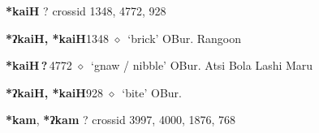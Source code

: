 \item
\textbf{*kaiH}
?
  {\tiny crossid 1348, 4772, 928}
  \begin{list}{}{\leftmargin=1.5em \itemindent=-1.5em}
  \item {\footnotesize \textbf{*ʔkaiH, *kaiH}}{\tiny 1348}
         $\diamond$~`brick'
         OBur. 
\hspace{1ex}
         Rangoon 
  \item {\footnotesize \textbf{*kaiH\,?\,}}{\tiny 4772}
\hspace{1ex}
         $\diamond$~`gnaw / nibble'
         OBur. 
\hspace{1ex}
         Atsi 
\hspace{1ex}
         Bola 
\hspace{1ex}
         Lashi 
\hspace{1ex}
         Maru 
  \item {\footnotesize \textbf{*ʔkaiH, *kaiH}}{\tiny 928}
\hspace{1ex}
         $\diamond$~`bite'
         OBur. 
  \end{list}
\item
\textbf{*kam}, \textbf{*ʔkam}
?
  {\tiny crossid 3997, 4000, 1876, 768}

